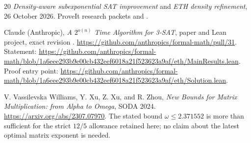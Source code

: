 \documentclass[11pt]{article}
\theoremstyle{definition}\newtheorem{definition}[theorem]{Definition}
\theoremstyle{remark}\newtheorem{remark}[theorem]{Remark}
\begin{document}
\begin{thebibliography}{20}
 \emph{Density-aware subexponential SAT improvement} and
\emph{ETH density refinement}, 26 October 2026. ProveIt research packets
 and .

 Claude (Anthropic), \emph{A $2^{o(n)}$ Time Algorithm
for 3-SAT}, paper and Lean project, exact revision
.
\url{https://github.com/anthropics/formal-math/pull/31}.
Statement: \url{https://github.com/anthropics/formal-math/blob/1a6eee293b9e00cb432eef6018a21f523623a9af/eth/MainResults.lean}.
Proof entry point: \url{https://github.com/anthropics/formal-math/blob/1a6eee293b9e00cb432eef6018a21f523623a9af/eth/Solution.lean}.

 V. Vassilevska Williams, Y. Xu, Z. Xu, and R. Zhou,
\emph{New Bounds for Matrix Multiplication: from Alpha to Omega},
SODA 2024. \url{https://arxiv.org/abs/2307.07970}.
The stated bound $\omega\le2.371552$ is more than sufficient for the
strict $12/5$ allowance retained here; no claim about the latest optimal
matrix exponent is needed.
\end{thebibliography}
\end{document}
